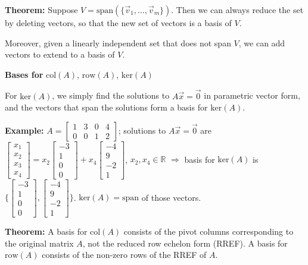\documentclass{article}
\begin{document}
\textbf{Theorem:} Suppose $V = \text{span}(\{\vec{v}_1, \ldots, \vec{v}_m\})$. Then we can always reduce the set by deleting vectors, so that the new set of vectors is a basis of $V$.

Moreover, given a linearly independent set that does not span \( V \), we can add vectors to extend to a basis of \( V \).

\textbf{Bases for} \( \text{col}(A) \), \( \text{row}(A) \), \( \text{ker}(A) \)

For \( \text{ker}(A) \), we simply find the solutions to \( A\vec{x} = \vec{0} \) in parametric vector form, and the vectors that span the solutions form a basis for \( \text{ker}(A) \).

\textbf{Example:} \( A = \begin{bmatrix} 1 & 3 & 0 & 4 \\ 0 & 0 & 1 & 2 \end{bmatrix} \); solutions to \( A\vec{x} = \vec{0} \) are \( \begin{bmatrix} x_1 \\ x_2 \\ x_3 \\ x_4 \end{bmatrix} = x_2\begin{bmatrix} -3 \\ 1 \\ 0 \\ 0 \end{bmatrix} + x_4\begin{bmatrix} -4 \\ 9 \\ -2 \\ 1 \end{bmatrix} \), \( x_2, x_4 \in \mathbb{R} \) \( \Rightarrow \) basis for \( \text{ker}(A) \) is \( \{ \begin{bmatrix} -3 \\ 1 \\ 0 \\ 0 \end{bmatrix}, \begin{bmatrix} -4 \\ 9 \\ -2 \\ 1 \end{bmatrix} \} \). \( \text{ker}(A) = \text{span} \) of those vectors.

\textbf{Theorem:} A basis for \( \text{col}(A) \) consists of the pivot columns corresponding to the original matrix \( A \), not the reduced row echelon form (RREF). A basis for \( \text{row}(A) \) consists of the non-zero rows of the RREF of \( A \).
\end{document}
